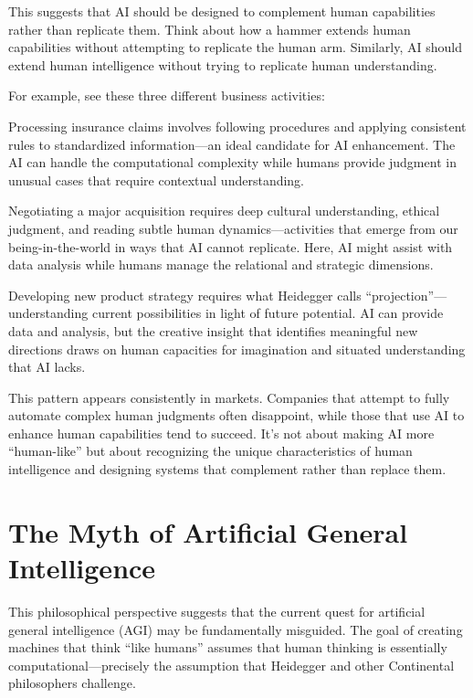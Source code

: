 \documentclass[
  Letterpaper,
]{scrbook}
\begin{document}
This suggests that AI should be designed to complement human
capabilities rather than
replicate them. Think about how a hammer extends human capabilities
without attempting to replicate the human arm. Similarly, AI should
extend human intelligence without trying to replicate human
understanding.

For example, see these three different business activities:

Processing insurance claims involves following procedures and applying
consistent rules to standardized information---an ideal candidate for AI
enhancement. The AI can handle the computational complexity while humans
provide judgment in unusual cases that require contextual
understanding.

Negotiating a major acquisition requires deep cultural understanding,
ethical judgment, and reading subtle human dynamics---activities that
emerge from our being-in-the-world in ways that AI cannot replicate.
Here, AI might assist with data analysis while humans manage the
relational and strategic dimensions.

Developing new product strategy requires what Heidegger calls
``projection''---understanding current possibilities in light of future
potential. AI can provide data and analysis, but the creative insight
that identifies meaningful new directions draws on human capacities for
imagination and situated understanding that AI lacks.

This pattern appears consistently in markets. Companies that attempt to
fully automate complex human judgments often disappoint, while those
that use AI to enhance human capabilities tend to succeed. It's not
about making AI more ``human-like'' but about recognizing the unique
characteristics of human intelligence and designing systems that
complement rather than replace them.

\section{The Myth of Artificial General
Intelligence}\label{the-myth-of-artificial-general-intelligence}

This philosophical perspective suggests that the current quest for
artificial general intelligence (AGI) may be fundamentally misguided.
The goal of creating machines that think ``like humans'' assumes that
human thinking is essentially computational---precisely the assumption
that Heidegger and other Continental philosophers challenge.
\end{document}
